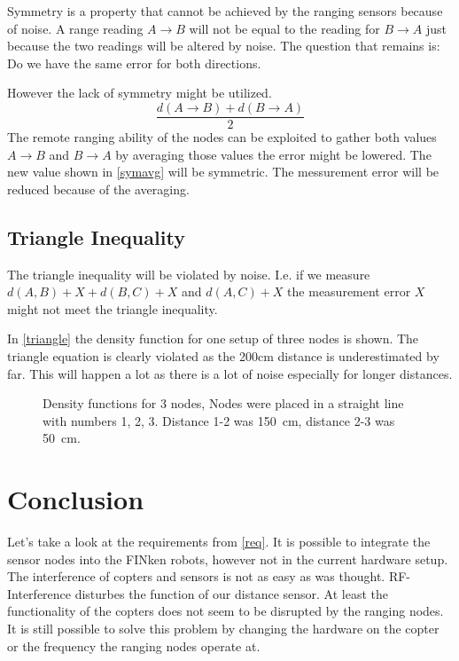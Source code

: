 Symmetry is a property that cannot be achieved by the ranging sensors because of noise. 
A range reading $A \rightarrow B$ will not be equal to the reading for $B \rightarrow A$ just because the two readings will be altered by noise.
The question that remains is: Do we have the same error for both directions.



However the lack of symmetry might be utilized.
\begin{equation}
\frac{ d(A \rightarrow B) + d(B \rightarrow A) }{2}
\label{symavg}
\end{equation}
The remote ranging ability of the nodes can be exploited to gather both values $A \rightarrow B$ and $B \rightarrow A$ by averaging those values the error might be lowered. 
The new value shown in \autoref{symavg} will be symmetric.
The messurement error will be reduced because of the averaging.

\subsection{Triangle Inequality}
The triangle inequality will be violated by noise.
I.e. if we measure $d(A,B) + X + d(B,C) + X$ and $d(A, C) + X$ the measurement error $X$ might not meet the triangle inequality.

In \autoref{triangle} the density function for one setup of three nodes is shown.
The triangle equation is clearly violated as the \si{200}{cm} distance is underestimated by far.
This will happen a lot as there is a lot of noise especially for longer distances.
\begin{figure}[H]
	\centering
	
	\caption[Density functions for 3 nodes]{Density functions for 3 nodes, Nodes were placed in a straight line with numbers 1, 2, 3. Distance 1-2 was \SI{150}{cm}, distance 2-3 was \SI{50}{cm}. }
	\label{triangle}
\end{figure}


\section{Conclusion}

Let's take a look at the requirements from \autoref{req}.
It is possible to integrate the sensor nodes into the FINken robots, however not in the current hardware setup.
The interference of copters and sensors is not as easy as was thought.
RF-Interference disturbes the function of our distance sensor.
At least the functionality of the copters does not seem to be disrupted by the ranging nodes.
It is still possible to solve this problem by changing the hardware on the copter or the frequency the ranging nodes operate at.

